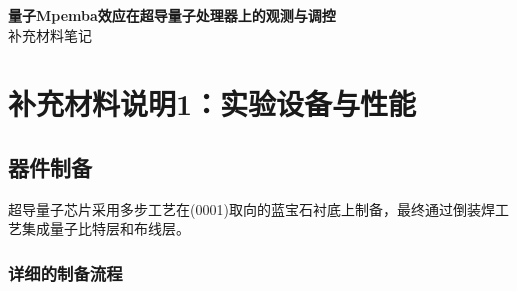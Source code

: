 \documentclass[11pt,a4paper]{article}
\begin{document}
\begin{center}
    {\LARGE \textbf{量子Mpemba效应在超导量子处理器上的观测与调控}} \\[6pt]
    {\large 补充材料笔记}
\end{center}

\section*{补充材料说明1：实验设备与性能}

\subsection{器件制备}

超导量子芯片采用多步工艺在(0001)取向的蓝宝石衬底上制备，最终通过倒装焊工艺集成量子比特层和布线层。

\subsubsection{详细的制备流程}
\end{document}
